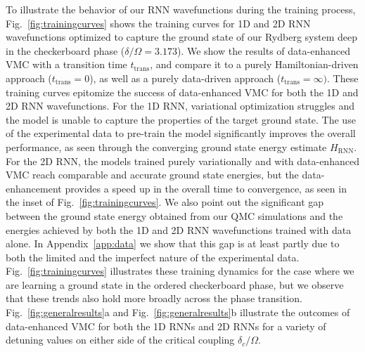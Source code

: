 \documentclass[twocolumn,
                showpacs,
                nofootinbib,
                nobibnotes,
                aps,
                superscriptaddress,
                amssymb,
                amsmath,
                floatfix,
                reprint,
                prx, 
                notitlepage,
                showkeys,
                10pt,
		]{revtex4-2}
\begin{document}
To illustrate the behavior of our RNN wavefunctions during the training process, Fig.~\ref{fig:trainingcurves} shows the training curves for 1D and 2D RNN wavefunctions optimized to capture the ground state of our Rydberg system deep in the checkerboard phase ($\delta/\Omega = 3.173$).
We show the results of data-enhanced VMC with a transition time $t_{\text{trans}}$, and compare it to a purely Hamiltonian-driven approach ($t_{\text{trans}} = 0$), as well as a purely data-driven approach ($t_{\text{trans}} = \infty)$.
These training curves epitomize the success of data-enhanced VMC for both the 1D and 2D RNN wavefunctions. 
For the 1D RNN, variational optimization struggles and the model is unable to capture the properties of the target ground state. The use of the experimental data to pre-train the model significantly improves the overall performance, as seen through the converging ground state energy estimate $H_{\text{RNN}}$. For the 2D RNN, the models trained purely variationally and with data-enhanced VMC reach comparable and accurate ground state energies, but the data-enhancement provides a speed up in the overall time to convergence, as seen in the inset of Fig.~\ref{fig:trainingcurves}. 
We also point out the significant gap between the ground state energy obtained from our QMC simulations and the energies achieved by both the 1D and 2D RNN wavefunctions trained with data alone. In Appendix~\ref{app:data} we show that this gap is at least partly due to both the limited and the imperfect nature of the experimental data. Fig.~\ref{fig:trainingcurves} illustrates these training dynamics for the case where we are learning a ground state in the ordered checkerboard phase, but we observe that these trends also hold more broadly across the phase transition.
Fig.~\ref{fig:generalresults}a and Fig.~\ref{fig:generalresults}b illustrate the outcomes of data-enhanced VMC for both the 1D RNNs and 2D RNNs
for a variety of detuning values on either side of the critical coupling $\delta_c/ \Omega$. 
\end{document}
